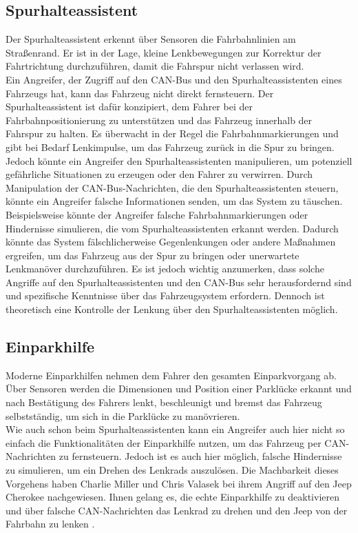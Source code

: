 \subsection{Spurhalteassistent}
Der Spurhalteassistent erkennt über Sensoren die Fahrbahnlinien am Straßenrand. Er ist in der Lage, kleine Lenkbewegungen zur Korrektur der Fahrtrichtung durchzuführen, damit die Fahrspur nicht verlassen wird.\\
Ein Angreifer, der Zugriff auf den \acs{CAN}-Bus und den Spurhalteassistenten eines Fahrzeugs hat, kann das Fahrzeug nicht direkt fernsteuern. Der Spurhalteassistent ist dafür konzipiert, dem Fahrer bei der Fahrbahnpositionierung zu unterstützen und das Fahrzeug innerhalb der Fahrspur zu halten. Es überwacht in der Regel die Fahrbahnmarkierungen und gibt bei Bedarf Lenkimpulse, um das Fahrzeug zurück in die Spur zu bringen.
Jedoch könnte ein Angreifer den Spurhalteassistenten manipulieren, um potenziell gefährliche Situationen zu erzeugen oder den Fahrer zu verwirren. Durch Manipulation der \acs{CAN}-Bus-Nachrichten, die den Spurhalteassistenten steuern, könnte ein Angreifer falsche Informationen senden, um das System zu täuschen.
Beispielsweise könnte der Angreifer falsche Fahrbahnmarkierungen oder Hindernisse simulieren, die vom Spurhalteassistenten erkannt werden. Dadurch könnte das System fälschlicherweise Gegenlenkungen oder andere Maßnahmen ergreifen, um das Fahrzeug aus der Spur zu bringen oder unerwartete Lenkmanöver durchzuführen.
Es ist jedoch wichtig anzumerken, dass solche Angriffe auf den Spurhalteassistenten und den \acs{CAN}-Bus sehr herausfordernd sind und spezifische Kenntnisse über das Fahrzeugsystem erfordern. Dennoch ist theoretisch eine Kontrolle der Lenkung über den Spurhalteassistenten möglich.

\subsection{Einparkhilfe}
Moderne Einparkhilfen nehmen dem Fahrer den gesamten Einparkvorgang ab. Über Sensoren werden die Dimensionen und Position einer Parklücke erkannt und nach Bestätigung des Fahrers lenkt, beschleunigt und bremst das Fahrzeug selbstständig, um sich in die Parklücke zu manövrieren.\\
Wie auch schon beim Spurhalteassistenten kann ein Angreifer auch hier nicht so einfach die Funktionalitäten der Einparkhilfe nutzen, um das Fahrzeug per \acs{CAN}-Nachrichten zu fernsteuern. Jedoch ist es auch hier möglich, falsche Hindernisse zu simulieren, um ein Drehen des Lenkrads auszulösen. Die Machbarkeit dieses Vorgehens haben Charlie Miller und Chris Valasek bei ihrem Angriff auf den Jeep Cherokee nachgewiesen. Ihnen gelang es, die echte Einparkhilfe zu deaktivieren und über falsche \acs{CAN}-Nachrichten das Lenkrad zu drehen und den Jeep von der Fahrbahn zu lenken \cite{Miller.2015}.

